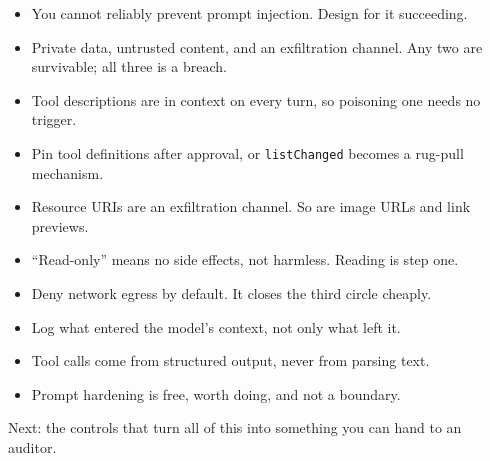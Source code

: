 \begin{itemize}[leftmargin=1.6em, itemsep=3pt]
\item You cannot reliably prevent prompt injection. Design for it succeeding.
\item Private data, untrusted content, and an exfiltration channel. Any two are
survivable; all three is a breach.
\item Tool descriptions are in context on every turn, so poisoning one needs no
trigger.
\item Pin tool definitions after approval, or \texttt{listChanged} becomes a
rug-pull mechanism.
\item Resource URIs are an exfiltration channel. So are image URLs and link
previews.
\item ``Read-only'' means no side effects, not harmless. Reading is step one.
\item Deny network egress by default. It closes the third circle cheaply.
\item Log what entered the model's context, not only what left it.
\item Tool calls come from structured output, never from parsing text.
\item Prompt hardening is free, worth doing, and not a boundary.
\end{itemize}

Next: the controls that turn all of this into something you can hand to an
auditor.
